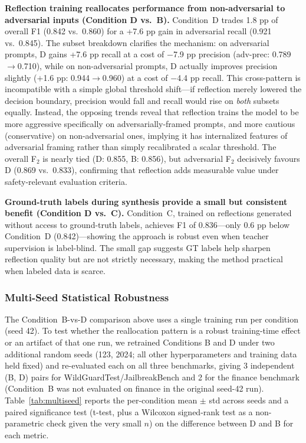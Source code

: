\documentclass[Superintelligence,article,submit,pdftex,moreauthors]{Definitions/mdpi}
\begin{document}
\textbf{Reflection training reallocates performance from non-adversarial to adversarial inputs (Condition D vs.\ B).}
Condition~D trades 1.8 pp of overall F1 (0.842 vs.\ 0.860) for a +7.6 pp gain in adversarial recall (0.921 vs.\ 0.845). The subset breakdown clarifies the mechanism: on adversarial prompts, D gains +7.6 pp recall at a cost of $-$7.9 pp precision (adv-prec: 0.789$\to$0.710), while on non-adversarial prompts, D actually improves precision slightly ($+$1.6 pp: 0.944$\to$0.960) at a cost of $-$4.4 pp recall. This cross-pattern is incompatible with a simple global threshold shift---if reflection merely lowered the decision boundary, precision would fall and recall would rise on \emph{both} subsets equally. Instead, the opposing trends reveal that reflection trains the model to be more aggressive specifically on adversarially-framed prompts, and more cautious (conservative) on non-adversarial ones, implying it has internalized features of adversarial framing rather than simply recalibrated a scalar threshold. The overall F$_2$ is nearly tied (D: 0.855, B: 0.856), but adversarial F$_2$ decisively favours D (0.869 vs.\ 0.833), confirming that reflection adds measurable value under safety-relevant evaluation criteria.

\textbf{Ground-truth labels during synthesis provide a small but consistent benefit (Condition D vs.\ C).}
Condition~C, trained on reflections generated without access to ground-truth labels, achieves F1 of 0.836---only 0.6 pp below Condition~D (0.842)---showing the approach is robust even when teacher supervision is label-blind. The small gap suggests GT labels help sharpen reflection quality but are not strictly necessary, making the method practical when labeled data is scarce.

\subsubsection{Multi-Seed Statistical Robustness}
\label{sec:multiseed}

The Condition~B-vs-D comparison above uses a single training run per condition (seed 42). To test whether the reallocation pattern is a robust training-time effect or an artifact of that one run, we retrained Conditions B and D under two additional random seeds (123, 2024; all other hyperparameters and training data held fixed) and re-evaluated each on all three benchmarks, giving 3 independent (B, D) pairs for WildGuardTest/JailbreakBench and 2 for the finance benchmark (Condition~B was not evaluated on finance in the original seed-42 run). Table~\ref{tab:multiseed} reports the per-condition mean $\pm$ std across seeds and a paired significance test (t-test, plus a Wilcoxon signed-rank test as a non-parametric check given the very small $n$) on the difference between D and B for each metric.
\end{document}
